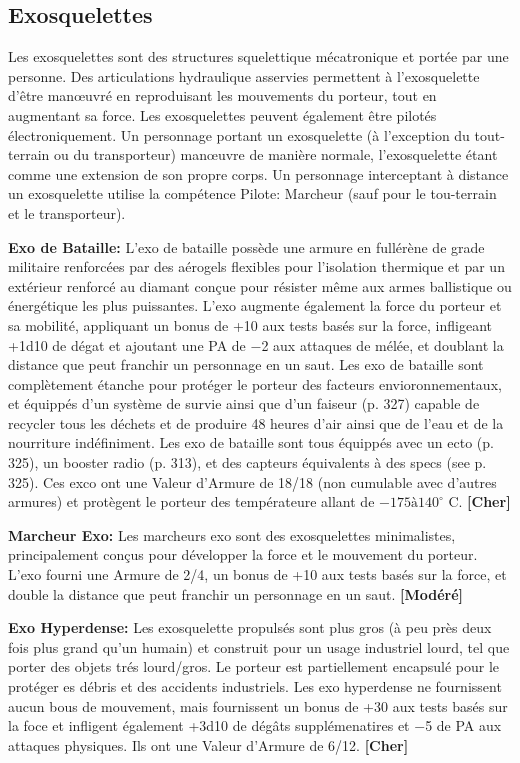 \subsection{Exosquelettes} \label{sec:exoskeletons} 

Les exosquelettes sont des structures squelettique mécatronique et portée par une personne. Des articulations hydraulique asservies permettent à l'exosquelette d'être manœuvré en reproduisant les mouvements du porteur, tout en augmentant sa force. Les exosquelettes peuvent également être pilotés électroniquement. Un personnage portant un exosquelette (à l'exception du tout-terrain ou du transporteur) manœuvre de manière normale, l'exosquelette étant comme une extension de son propre corps. Un personnage interceptant à distance un exosquelette utilise la compétence Pilote: Marcheur (sauf pour le tou-terrain et le transporteur). 

\textbf{Exo de Bataille:} L'exo de bataille possède une armure en fullérène de grade militaire renforcées par des aérogels flexibles pour l'isolation thermique et par un extérieur renforcé au diamant conçue pour résister même aux armes ballistique ou énergétique les plus puissantes. L'exo augmente également la force du porteur et sa mobilité, appliquant un bonus de +10 aux tests basés sur la force, infligeant +1d10 de dégat et ajoutant une PA de $-$2 aux attaques de mélée, et doublant la distance que peut franchir un personnage en un saut. Les exo de bataille sont complètement étanche pour protéger le porteur des facteurs envioronnementaux, et équippés d'un système de survie ainsi que d'un faiseur (p. 327) capable de recycler tous les déchets et de produire 48 heures d'air ainsi que de l'eau et de la nourriture indéfiniment. Les exo de bataille sont tous équippés avec un ecto (p. 325), un booster radio (p. 313), et des capteurs équivalents à des specs (see p. 325). Ces exco ont une Valeur d'Armure de 18/18 (non cumulable avec d'autres armures) et protègent le porteur des températeure allant de $-175 à 140^{\circ}$ C. \textbf{[Cher]} 

\textbf{Marcheur Exo:} Les marcheurs exo sont des exosquelettes minimalistes, principalement conçus pour développer la force et le mouvement du porteur. L'exo fourni une Armure de 2/4, un bonus de +10 aux tests basés sur la force, et double la distance que peut franchir un personnage en un saut. \textbf{[Modéré]} 

\textbf{Exo Hyperdense:} Les exosquelette propulsés sont plus gros (à peu près deux fois plus grand qu'un humain) et construit pour un usage industriel lourd, tel que porter des objets trés lourd/gros. Le porteur est partiellement encapsulé pour le protéger es débris et des accidents industriels. Les exo hyperdense ne fournissent aucun bous de mouvement, mais fournissent un bonus de +30 aux tests basés sur la foce et infligent également +3d10 de dégâts supplémenatires et $-$5 de PA aux attaques physiques. Ils ont une Valeur d'Armure de 6/12. \textbf{[Cher]} 

